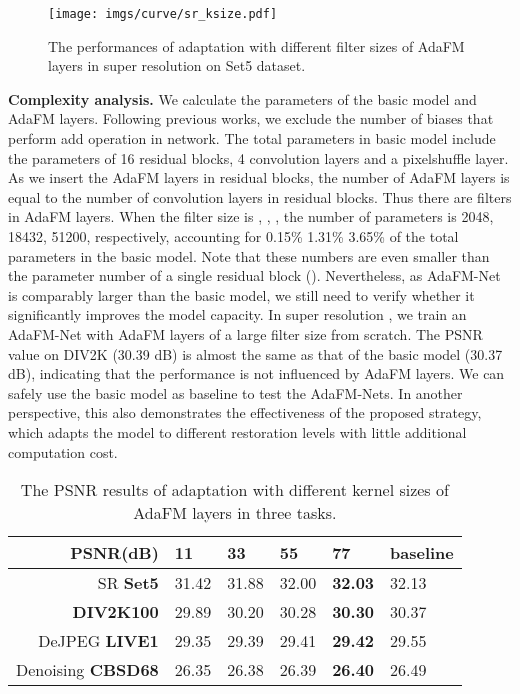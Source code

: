 \documentclass[10pt,twocolumn,letterpaper]{article}
\begin{document}
\begin{figure}[]
	\vspace{-1.5em}
	\centering
	\texttt{[image: imgs/curve/sr\_ksize.pdf]}
\vspace{-1.5em}
	\caption{The performances of adaptation with different filter sizes of AdaFM layers in super resolution on Set5 dataset.}
	\vspace{-2em}
	\label{kernel_size_figure}
\end{figure}

\textbf{Complexity analysis.}
We calculate the parameters of the basic model and AdaFM layers. Following previous works, we exclude the number of biases that perform add operation in network. The total parameters in basic model include the parameters of 16 residual blocks, 4 convolution layers and a pixelshuffle layer. As we insert the AdaFM layers in residual blocks, the number of AdaFM layers is equal to the number of convolution layers in residual blocks. Thus there are  filters in AdaFM layers. When the filter size is , , , the number of parameters is 2048, 18432, 51200, respectively, accounting for 0.15\% 1.31\% 3.65\% of the total parameters in the basic model. Note that these numbers are even smaller than the parameter number of a single residual block (). Nevertheless, as AdaFM-Net is comparably larger than the basic model, we still need to verify whether it significantly improves the model capacity. In super resolution , we train an AdaFM-Net with AdaFM layers of a large filter size  from scratch. The PSNR value on DIV2K (30.39 dB) is almost the same as that of the basic model (30.37 dB), indicating that the performance is not influenced by AdaFM layers. We can safely use the basic model as baseline to test the AdaFM-Nets. In another perspective, this also demonstrates the effectiveness of the proposed strategy, which adapts the model to different restoration levels with little additional computation cost.


\begin{table}[]
\small
\centering
\begin{tabular}{r|p{1.8em}p{1.8em}p{1.8em}p{2em}|p{2.5em}}
\hline
\hline
 PSNR(dB)& 11 & 33 & 55 & 77 & baseline  \\ \hline
SR \; \quad \quad \quad \quad \textbf{Set5} & 31.42 & 31.88 & 32.00 & \textbf{32.03} & 32.13 \\

\textbf{DIV2K100} & 29.89 & 30.20 & 30.28 & \textbf{30.30} & 30.37 \\
 \hline
DeJPEG \quad\;\textbf{LIVE1} & 29.35 & 29.39 & 29.41 & \textbf{29.42} & 29.55 \\
\hline
 
Denoising \textbf{CBSD68} & 26.35 & 26.38 & 26.39 & \textbf{26.40} & 26.49 \\
 \hline
\end{tabular}
\vspace{-1em}
\caption{The PSNR results of adaptation with different kernel sizes of AdaFM layers in three tasks.}
\vspace{-1em}
\label{table:kernel_size}
\end{table}
\end{document}
